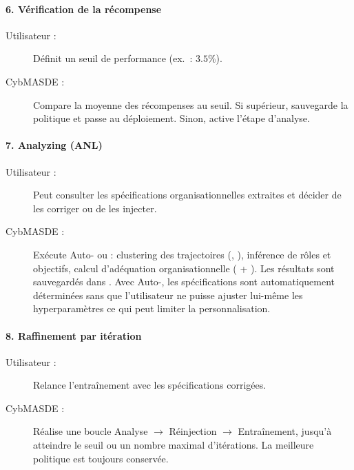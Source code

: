 \paragraph{6. Vérification de la récompense}
\begin{description}
  \item[Utilisateur :] Définit un seuil de performance (ex.~: $3.5\%$).
  \item[CybMASDE :] Compare la moyenne des récompenses au seuil. Si supérieur, sauvegarde la politique et passe au déploiement. Sinon, active l'étape d'analyse.
\end{description}

\paragraph{7. Analyzing (ANL)}
\begin{description}
  \item[Utilisateur :] Peut consulter les spécifications organisationnelles extraites et décider de les corriger ou de les injecter.
  \item[CybMASDE :] Exécute Auto- ou  : clustering des trajectoires (, ), inférence de rôles et objectifs, calcul d'adéquation organisationnelle ( + ). Les résultats sont sauvegardés dans . Avec Auto-, les spécifications sont automatiquement déterminées sans que l'utilisateur ne puisse ajuster lui-même les hyperparamètres ce qui peut limiter la personnalisation.
\end{description}

\paragraph{8. Raffinement par itération}
\begin{description}
  \item[Utilisateur :] Relance l'entraînement avec les spécifications corrigées.
  \item[CybMASDE :] Réalise une boucle Analyse $\rightarrow$ Réinjection $\rightarrow$ Entraînement, jusqu'à atteindre le seuil ou un nombre maximal d'itérations. La meilleure politique est toujours conservée.
\end{description}


